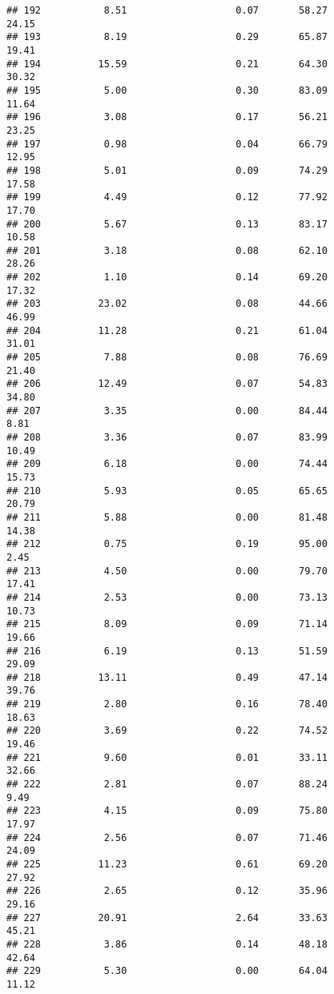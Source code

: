 \documentclass[
]{article}
\begin{document}
\begin{verbatim}
## 192           8.51                   0.07       58.27          24.15
## 193           8.19                   0.29       65.87          19.41
## 194          15.59                   0.21       64.30          30.32
## 195           5.00                   0.30       83.09          11.64
## 196           3.08                   0.17       56.21          23.25
## 197           0.98                   0.04       66.79          12.95
## 198           5.01                   0.09       74.29          17.58
## 199           4.49                   0.12       77.92          17.70
## 200           5.67                   0.13       83.17          10.58
## 201           3.18                   0.08       62.10          28.26
## 202           1.10                   0.14       69.20          17.32
## 203          23.02                   0.08       44.66          46.99
## 204          11.28                   0.21       61.04          31.01
## 205           7.88                   0.08       76.69          21.40
## 206          12.49                   0.07       54.83          34.80
## 207           3.35                   0.00       84.44           8.81
## 208           3.36                   0.07       83.99          10.49
## 209           6.18                   0.00       74.44          15.73
## 210           5.93                   0.05       65.65          20.79
## 211           5.88                   0.00       81.48          14.38
## 212           0.75                   0.19       95.00           2.45
## 213           4.50                   0.00       79.70          17.41
## 214           2.53                   0.00       73.13          10.73
## 215           8.09                   0.09       71.14          19.66
## 216           6.19                   0.13       51.59          29.09
## 218          13.11                   0.49       47.14          39.76
## 219           2.80                   0.16       78.40          18.63
## 220           3.69                   0.22       74.52          19.46
## 221           9.60                   0.01       33.11          32.66
## 222           2.81                   0.07       88.24           9.49
## 223           4.15                   0.09       75.80          17.97
## 224           2.56                   0.07       71.46          24.09
## 225          11.23                   0.61       69.20          27.92
## 226           2.65                   0.12       35.96          29.16
## 227          20.91                   2.64       33.63          45.21
## 228           3.86                   0.14       48.18          42.64
## 229           5.30                   0.00       64.04          11.12

\end{verbatim}
\end{document}
